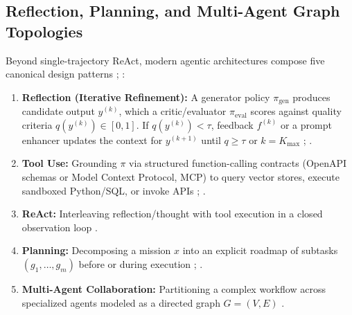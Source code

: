 \documentclass[../../../../master.tex]{subfiles}
\begin{document}
\subsection{Reflection, Planning, and Multi-Agent Graph Topologies}

Beyond single-trajectory ReAct, modern agentic architectures compose five canonical design patterns ; :
\begin{enumerate}
  \item \textbf{Reflection (Iterative Refinement):} A generator policy $\pi_{\mathrm{gen}}$ produces candidate output $y^{(k)}$, which a critic/evaluator $\pi_{\mathrm{eval}}$ scores against quality criteria $q(y^{(k)}) \in [0,1]$. If $q(y^{(k)}) < \tau$, feedback $f^{(k)}$ or a prompt enhancer updates the context for $y^{(k+1)}$ until $q \ge \tau$ or $k = K_{\max}$ ; .
  \item \textbf{Tool Use:} Grounding $\pi$ via structured function-calling contracts (OpenAPI schemas or Model Context Protocol, MCP) to query vector stores, execute sandboxed Python/SQL, or invoke APIs ; .
  \item \textbf{ReAct:} Interleaving reflection/thought with tool execution in a closed observation loop .
  \item \textbf{Planning:} Decomposing a mission $x$ into an explicit roadmap of subtasks $(g_1, \dots, g_m)$ before or during execution ; .
  \item \textbf{Multi-Agent Collaboration:} Partitioning a complex workflow across specialized agents modeled as a directed graph $G = (V, E)$ .
\end{enumerate}
\end{document}

